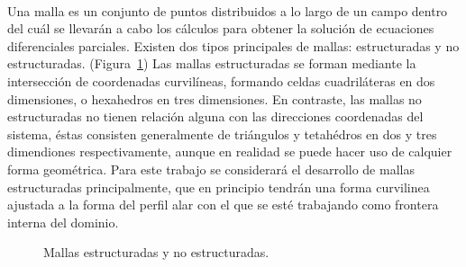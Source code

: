 \documentclass[letterpaper, openright, 12pt]{book}
\begin{document}
    \paragraph*{}
    Una malla es un conjunto de puntos distribuidos a lo largo de un campo
    dentro del cuál se llevarán a cabo los cálculos para obtener la solución
    de ecuaciones diferenciales parciales. Existen dos tipos principales de
    mallas: estructuradas y no estructuradas.
    (Figura~\ref{fig:malla-estructurada-noestructurada})
    Las mallas estructuradas se forman mediante la intersección de
    coordenadas curvilíneas, formando celdas cuadriláteras en dos
    dimensiones, o hexahedros en tres dimensiones. En contraste, las mallas
    no estructuradas no tienen relación alguna con las direcciones
    coordenadas del sistema, éstas consisten generalmente de triángulos y
    tetahédros en dos y tres dimendiones respectivamente, aunque en realidad
    se puede hacer uso de calquier forma geométrica. Para este trabajo se
    considerará el desarrollo  de  mallas estructuradas principalmente, que
    en principio tendrán una forma curvilinea ajustada a la forma del perfil
    alar con el que se esté trabajando como frontera interna del dominio.
    \begin{figure}[htbp!]
        \centering
         \hspace{20mm} %
        \caption[Mallas estructuradas y no estructuradas]{Mallas estructuradas
        y no estructuradas.\cite{cengel}}
        \label{fig:malla-estructurada-noestructurada}
    \end{figure}
\end{document}
